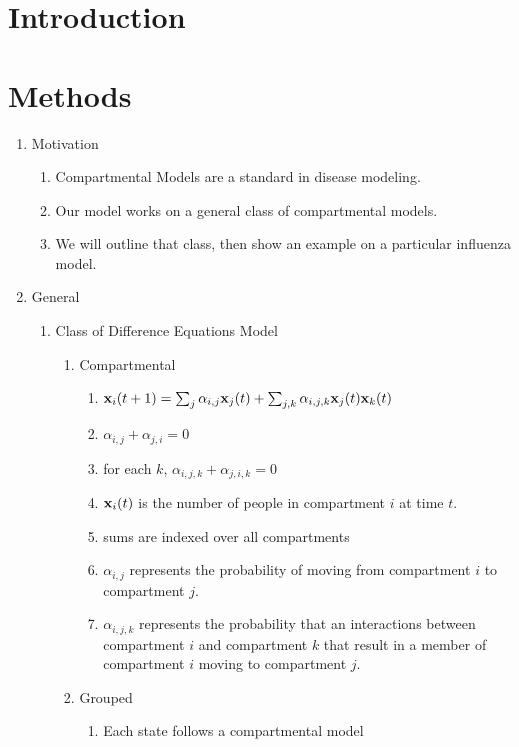 \documentclass{article}
\renewcommand{\vec}[1]{{\textbf #1}}
\begin{document}
\section{Introduction}
\section{Methods}
\begin{enumerate}
	\item Motivation
	\begin{enumerate}
		\item Compartmental Models are a standard in disease modeling.
		\item Our model works on a general class of compartmental models.
		\item We will outline that class, then show an example on a particular influenza model.
	\end{enumerate}
	\item General
	\begin{enumerate}
		\item Class of Difference Equations Model
		\begin{enumerate}
			\item Compartmental
			\begin{enumerate}
				\item $\vec{x}_i(t+1) = \sum_{j} \alpha_{i,j} \vec{x}_j(t) +  \sum_{j,k} \alpha_{i,j,k} \vec{x}_j(t) \vec x_k(t)$
				\item $\alpha_{i,j} + \alpha_{j,i} = 0$
				\item for each $k$, $\alpha_{i,j,k} + \alpha_{j,i,k} = 0$
				\item $\vec x_i(t)$ is the number of people in compartment $i$ at time $t$.
				\item sums are indexed over all compartments
				\item $\alpha_{i,j}$ represents the probability of moving from compartment $i$ to compartment $j$.
				\item $\alpha_{i,j,k}$ represents the probability that an interactions between compartment $i$ and compartment $k$ that result in a member of compartment $i$ moving to compartment $j$.
			\end{enumerate}
			\item Grouped
			\begin{enumerate}
				\item Each state follows a compartmental model

\end{enumerate}
\end{enumerate}
\end{enumerate}
\end{enumerate}
\end{document}
